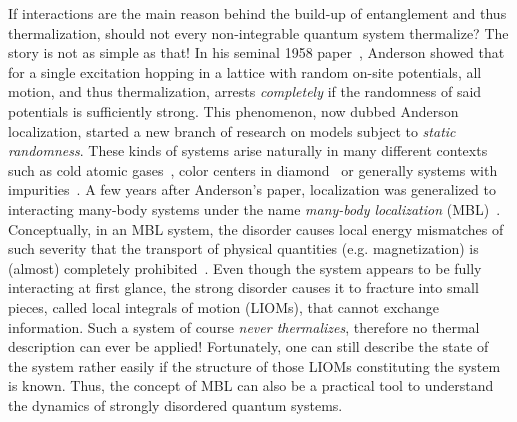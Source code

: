 If interactions are the main reason behind the build-up of entanglement and thus thermalization, should not every non-integrable quantum system thermalize? The story is not as simple as that! 
In his seminal 1958 paper~\cite{andersonAbsenceDiffusionCertain1958}, Anderson showed that for a single excitation hopping in a lattice with random on-site potentials, all motion, and thus thermalization, arrests \emph{completely} if the randomness of said potentials is sufficiently strong.
This phenomenon, now dubbed Anderson localization, started a new branch of research on models subject to \emph{static randomness}. These kinds of systems arise naturally in many different contexts such as cold atomic gases~\cite{schreiberObservationManybodyLocalization2015,kondovDisorderInducedLocalizationStrongly2015}, color centers in diamond~\cite{kucskoCriticalThermalizationDisordered2018,martinControllingLocalThermalization2023} or generally systems with impurities~\cite{weiExploringLocalizationNuclear2018,silevitchTuningHighQNonlinear2019}. A few years after Anderson's paper, localization was generalized to interacting many-body systems under the name \emph{many-body localization} (MBL)~\cite{fleishmanInteractionsAndersonTransition1980,baskoMetalinsulatorTransitionWeakly2006,gornyiInteractingElectronsDisordered2005,bauerAreaLawsManybody2013}. Conceptually, in an MBL system, the disorder causes local energy mismatches of such severity that the transport of physical quantities (e.g. magnetization) is (almost) completely prohibited~\cite{serbynLocalConservationLaws2013,husePhenomenologyFullyManybodylocalized2014,imbrieReviewLocalIntegrals2017}. Even though the system appears to be fully interacting at first glance, the strong disorder causes it to fracture into small pieces, called local integrals of motion (LIOMs), that cannot exchange information. Such a system of course \emph{never thermalizes}, therefore no thermal description can ever be applied! Fortunately, one can still describe the state of the system rather easily if the structure of those LIOMs constituting the system is known. Thus, the concept of MBL can also be a practical tool to understand the dynamics of strongly disordered quantum systems.


